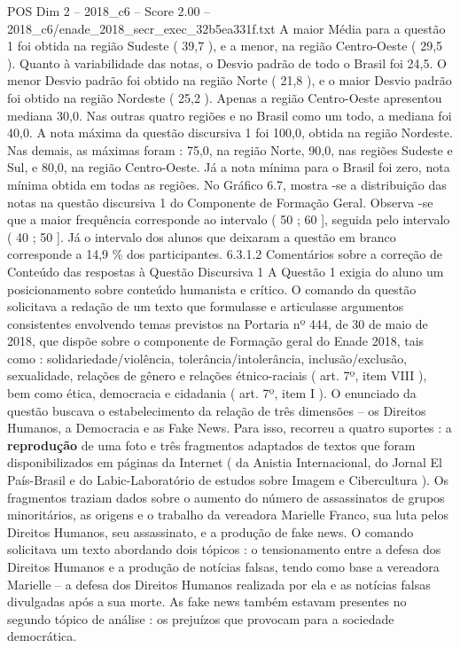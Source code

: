 \begin{textsample}{POS Dim 2 – 2018\_c6 – Score 2.00 – 2018\_c6/enade\_2018\_secr\_exec\_32b5ea331f.txt}
A maior Média para a questão 1 foi obtida na região Sudeste ( 39,7 ), e a menor, na região Centro-Oeste ( 29,5 ).
Quanto à variabilidade das notas, o Desvio padrão de todo o Brasil foi 24,5.
O menor Desvio padrão foi obtido na região Norte ( 21,8 ), e o maior Desvio padrão foi obtido na região Nordeste ( 25,2 ).
Apenas a região Centro-Oeste apresentou mediana 30,0.
Nas outras quatro regiões e no Brasil como um todo, a mediana foi 40,0.
A nota máxima da questão discursiva 1 foi 100,0, obtida na região Nordeste.
Nas demais, as máximas foram : 75,0, na região Norte, 90,0, nas regiões Sudeste e Sul, e 80,0, na região Centro-Oeste.
Já a nota mínima para o Brasil foi zero, nota mínima obtida em todas as regiões.
No Gráfico 6.7, mostra -se a distribuição das notas na questão discursiva 1 do Componente de Formação Geral.
Observa -se que a maior frequência corresponde ao intervalo ( 50 ; 60 ], seguida pelo intervalo ( 40 ; 50 ].
Já o intervalo dos alunos que deixaram a questão em branco corresponde a 14,9 \% dos participantes. 6.3.1.2 Comentários sobre a correção de Conteúdo das respostas à Questão Discursiva 1 A Questão 1 exigia do aluno um posicionamento sobre conteúdo humanista e crítico.
O comando da questão solicitava a redação de um texto que formulasse e articulasse argumentos consistentes envolvendo temas previstos na Portaria nº 444, de 30 de maio de 2018, que dispõe sobre o componente de Formação geral do Enade 2018, tais como : solidariedade/violência, tolerância/intolerância, inclusão/exclusão, sexualidade, relações de gênero e relações étnico-raciais ( art. 7º, item VIII ), bem como ética, democracia e cidadania ( art. 7º, item I ).
O enunciado da questão buscava o estabelecimento da relação de três dimensões – os Direitos Humanos, a Democracia e as Fake News.
Para isso, recorreu a quatro suportes : a \textbf{reprodução} de uma foto e três fragmentos adaptados de textos que foram disponibilizados em páginas da Internet ( da Anistia Internacional, do Jornal El País-Brasil e do Labic-Laboratório de estudos sobre Imagem e Cibercultura ).
Os fragmentos traziam dados sobre o aumento do número de assassinatos de grupos minoritários, as origens e o trabalho da vereadora Marielle Franco, sua luta pelos Direitos Humanos, seu assassinato, e a produção de fake news.
O comando solicitava um texto abordando dois tópicos : o tensionamento entre a defesa dos Direitos Humanos e a produção de notícias falsas, tendo como base a vereadora Marielle – a defesa dos Direitos Humanos realizada por ela e as notícias falsas divulgadas após a sua morte.
As fake news também estavam presentes no segundo tópico de análise : os prejuízos que provocam para a sociedade democrática.

\end{textsample}
